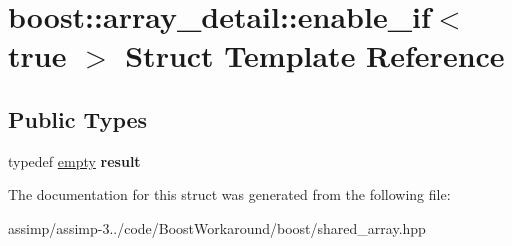 \hypertarget{structboost_1_1array__detail_1_1enable__if_3_01true_01_4}{\section{boost\+:\+:array\+\_\+detail\+:\+:enable\+\_\+if$<$ true $>$ Struct Template Reference}
\label{structboost_1_1array__detail_1_1enable__if_3_01true_01_4}
}
\subsection*{Public Types}
\begin{DoxyCompactItemize}
\item 
\hypertarget{structboost_1_1array__detail_1_1enable__if_3_01true_01_4_a8ff3f358eef107d2d2f331d8942fed83}{typedef \hyperlink{structboost_1_1array__detail_1_1empty}{empty} {\bfseries result}}\label{structboost_1_1array__detail_1_1enable__if_3_01true_01_4_a8ff3f358eef107d2d2f331d8942fed83}

\end{DoxyCompactItemize}


The documentation for this struct was generated from the following file\+:\begin{DoxyCompactItemize}
\item 
assimp/assimp-\/3../code/\+Boost\+Workaround/boost/shared\+\_\+array.\+hpp\end{DoxyCompactItemize}
